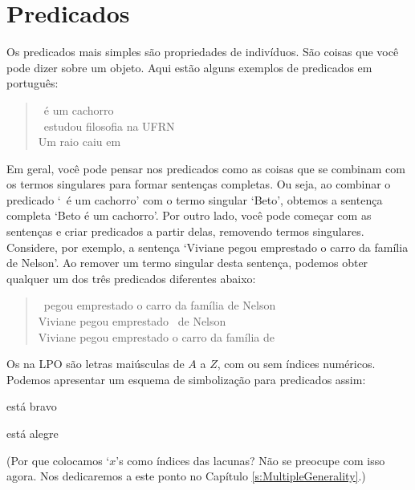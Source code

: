 \section{Predicados}
Os predicados mais simples são propriedades de indivíduos.
São coisas que você pode dizer sobre um objeto.
Aqui estão alguns exemplos de predicados em português:
	\begin{quote}
		\blank\ é um cachorro\\
		\blank\ estudou filosofia na UFRN\\
		Um raio caiu em \blank
	\end{quote}
Em geral, você pode pensar nos predicados como as coisas que se combinam com os termos singulares para formar sentenças completas.
Ou seja, ao combinar o predicado `\blank\ é um cachorro' com o termo singular `Beto', obtemos a sentença completa `Beto é um cachorro'.
Por outro lado, você pode começar com as sentenças e criar predicados a partir delas, removendo termos singulares.
Considere, por exemplo, a sentença `Viviane pegou emprestado o carro da família de Nelson'.
Ao remover um termo singular desta sentença, podemos obter qualquer um dos três predicados diferentes abaixo:
	\begin{quote}
		\blank\ pegou emprestado o carro da família de Nelson\\
		Viviane pegou emprestado \blank\ de Nelson\\
		Viviane pegou emprestado o carro da família de \blank
	\end{quote}
Os  na LPO são letras maiúsculas de $A$ a $Z$, com ou sem índices numéricos.
Podemos apresentar um esquema de simbolização para predicados assim:
	\begin{ekey}
		\item[\atom{B}{x}]  está bravo
		\item[\atom{A}{x}]  está alegre
	\end{ekey}
       (Por que colocamos `$x$'s como índices das lacunas? Não se preocupe com isso agora.
       Nos dedicaremos a este ponto no Capítulo \ref{s:MultipleGenerality}.)


